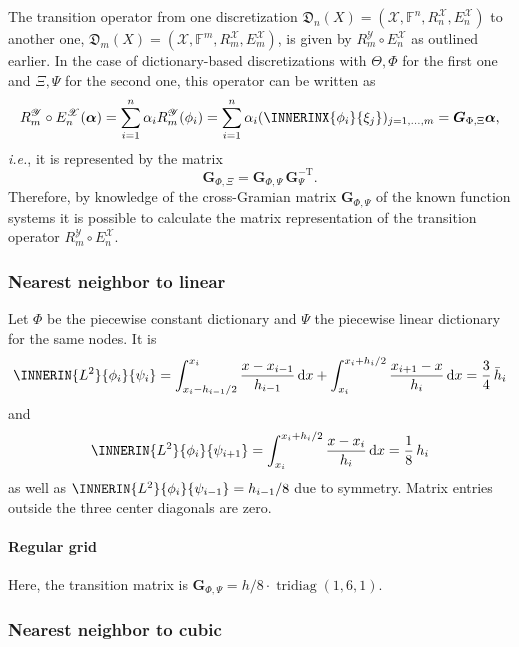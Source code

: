\documentclass[a4paper]{paper}
\newcommand*{\SPC}[1]{{\ensuremath{\mathscr{#1}}}}
\newcommand*{\SPCX}{\SPC{X}}
\newcommand*{\FIELD}{{\ensuremath{\mathbb{F}}}}
\newcommand*{\Fn}{{\ensuremath{\FIELD^n}}}
\newcommand*{\Fm}{{\ensuremath{\FIELD^m}}}
\newcommand*{\EXT}[2]{\ensuremath{E_{#1}^{#2}}}
\newcommand*{\REST}[2]{\ensuremath{R_{#1}^{#2}}}
\newcommand*{\RnX}{{\ensuremath{\REST{n}{\SPC{X}}}}}
\newcommand*{\RmX}{{\ensuremath{\REST{m}{\SPC{X}}}}}
\newcommand*{\RmY}{{\ensuremath{\REST{m}{\SPC{Y}}}}}
\newcommand*{\EnX}{{\ensuremath{\EXT{n}{\SPC{X}}}}}
\newcommand*{\EmX}{{\ensuremath{\EXT{m}{\SPC{X}}}}}
\newcommand*{\DISCR}[2]{{\ensuremath{\mathfrak{D}_{#1}(#2)}}}
\newcommand*{\DISCRnX}{\DISCR{n}{X}}
\DeclareMathOperator{\TRIDIAG}{{tridiag}}
\newcommand*{\D}{{\ensuremath{\mathrm{d}}}}
\newcommand*{\ie}{\textsl{i.e.}\xspace}
\newcommand*{\BDalpha}{\boldsymbol{\alpha}}
\newcommand*{\BDG}{\boldsymbol{G}}
\begin{document}
The transition operator from one discretization $\DISCRnX = (\SPCX, \Fn, \RnX, \EnX)$ to another one,
$\DISCR{m}{X} = (\SPCX, \Fm, \RmX, \EmX)$, is given by $\RmY \circ \EnX$ as outlined earlier. In the case of 
dictionary-based discretizations with $\Theta, \Phi$ for the first one and $\Xi, \Psi$ for the second one, this 
operator can be written as
%
\begin{equation*}
 \RmY \circ \EnX(\BDalpha) 
 = \sum_{i=1}^n \alpha_i \RmY(\phi_i)
 = \sum_{i=1}^n \alpha_i (\INNERINX{\phi_i}{\xi_j})_{j=1,\dots,m}
 = \BDG_{\Phi,\Xi} \BDalpha,
\end{equation*}
%
\ie, it is represented by the matrix
%
\begin{equation*}
 \BDG_{\Phi,\Xi} = \BDG_{\Phi,\Psi}\, \BDG_\Psi^{-\mathrm{T}}.
\end{equation*}
%
Therefore, by knowledge of the cross-Gramian matrix $\BDG_{\Phi,\Psi}$ of the known function systems it is possible 
to calculate the matrix representation of the transition operator $\RmY \circ \EnX$.


\subsubsection{Nearest neighbor to linear}
\label{subsubsec:specif:rediscr:nn2lin}

Let $\Phi$ be the piecewise constant dictionary and $\Psi$ the piecewise linear dictionary for the same nodes. It is
%
\begin{equation*}
 \INNERIN{L^2}{\phi_i}{\psi_i} 
 = \int_{x_i - h_{i-1}/2}^{x_i} \frac{x-x_{i-1}}{h_{i-1}}\, \D x +
 \int_{x_i}^{x_i + h_i/2} \frac{x_{i+1} - x}{h_i}\, \D x
 = \frac{3}{4}\, \bar h_i
\end{equation*}
%
and
%
\begin{equation*}
 \INNERIN{L^2}{\phi_i}{\psi_{i+1}} 
 = \int_{x_i}^{x_i + h_i/2} \frac{x - x_i}{h_i}\, \D x
 = \frac{1}{8}\, h_i
\end{equation*}
%
as well as $\INNERIN{L^2}{\phi_i}{\psi_{i-1}} = h_{i-1}/8$ due to symmetry. Matrix entries outside the 
three center diagonals are zero.

\paragraph{Regular grid}

Here, the transition matrix is $\BDG_{\Phi, \Psi} = h/8\cdot\TRIDIAG(1, 6, 1)$.


\subsubsection{Nearest neighbor to cubic}
\label{subsubsec:specif:rediscr:nn2cub}
\end{document}
